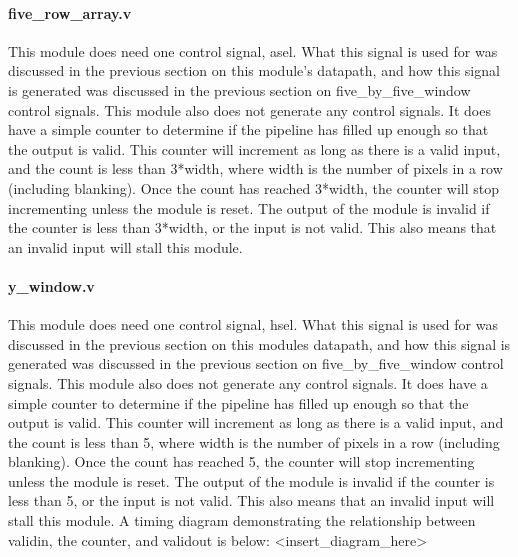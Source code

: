 \documentclass[12pt]{article}
\begin{document}
\paragraph{five\_row\_array.v}
This module does need one control signal, asel. What this signal is used for was discussed in the previous section on this module's datapath, and how this signal is generated was discussed in the previous section on five\_by\_five\_window control signals. This module also does not generate any control signals. It does have a simple counter to determine if the pipeline has filled up enough so that the output is valid. This counter will increment as long as there is a valid input, and the count is less than 3*width, where width is the number of pixels in a row (including blanking). Once the count has reached 3*width, the counter will stop incrementing unless the module is reset. The output of the module is invalid if the counter is less than 3*width, or the input is not valid. This also means that an invalid input will stall this module.

\paragraph{y\_window.v}
This module does need one control signal, hsel. What this signal is used for was 
discussed in the previous section on this modules datapath, and how this 
signal is generated was discussed in the previous section on five\_by\_five\_window 
control signals. This module also does not generate any control signals. It does 
have a simple counter to determine if the pipeline has filled up enough so that 
the output is valid. This counter will increment as long as there is a valid 
input, and the count is less than 5, where width is the number of pixels in 
a row (including blanking). Once the count has reached 5, the counter will stop 
incrementing unless the module is reset. The output of the module is invalid if 
the counter is less than 5, or the input is not valid. This also means that an 
invalid input will stall this module. A timing diagram demonstrating the 
relationship between validin, the counter, and validout is below: 
<insert\_diagram\_here>
\end{document}
